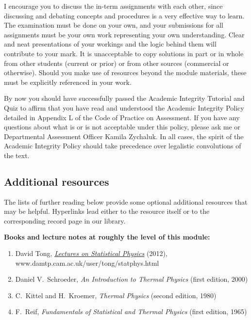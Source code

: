 I encourage you to discuss the in-term assignments with each other, since discussing and debating concepts and procedures is a very effective way to learn.
The examination must be done on your own, and your submissions for all assignments must be your own work representing your own understanding.
Clear and neat presentations of your workings and the logic behind them will contribute to your mark.
It is unacceptable to copy solutions in part or in whole from other students (current or prior) or from other sources (commercial or otherwise).
Should you make use of resources beyond the module materials, these must be explicitly referenced in your work.

By now you should have successfully passed the Academic Integrity Tutorial and Quiz to affirm that you have read and understood the Academic Integrity Policy detailed in Appendix L of the Code of Practice on Assessment.
If you have any questions about what is or is not acceptable under this policy, please ask me or Departmental Assessment Officer Kamila Zychaluk.
In all cases, the spirit of the Academic Integrity Policy should take precedence over legalistic convolutions of the text.



\subsection*{Additional resources}
The lists of further reading below provide some optional additional resources that may be helpful.
Hyperlinks lead either to the resource itself or to the corresponding record page in our library.

\noindent\textbf{Books and lecture notes at roughly the level of this module:} \\[-24 pt]
\begin{enumerate}
  \item David Tong, \href{https://www.damtp.cam.ac.uk/user/tong/statphys.html}{\textit{Lectures on Statistical Physics}} (2012), \\ www.damtp.cam.ac.uk/user/tong/statphys.html
  \item Daniel V.~Schroeder, \textit{An Introduction to Thermal Physics} (first edition, 2000)
  \item C.~Kittel and H.~Kroemer, \textit{Thermal Physics} (second edition, 1980)
  \item F.~Reif, \textit{Fundamentals of Statistical and Thermal Physics} (first edition, 1965)
\end{enumerate}

